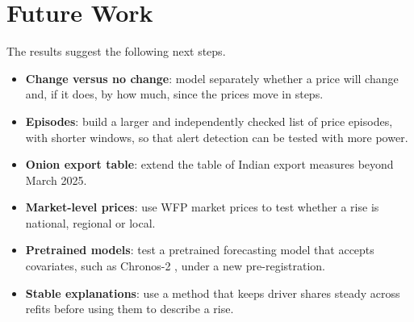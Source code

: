 \section{Future Work}
The results suggest the following next steps.
\begin{itemize}
    \item \textbf{Change versus no change}: model separately whether a price will change and, if it does, by how much, since the prices move in steps.
    \item \textbf{Episodes}: build a larger and independently checked list of price episodes, with shorter windows, so that alert detection can be tested with more power.
    \item \textbf{Onion export table}: extend the table of Indian export measures beyond March 2025.
    \item \textbf{Market-level prices}: use WFP market prices to test whether a rise is national, regional or local.
    \item \textbf{Pretrained models}: test a pretrained forecasting model that accepts covariates, such as Chronos-2 \cite{chronos2}, under a new pre-registration.
    \item \textbf{Stable explanations}: use a method that keeps driver shares steady across refits before using them to describe a rise.
\end{itemize}
